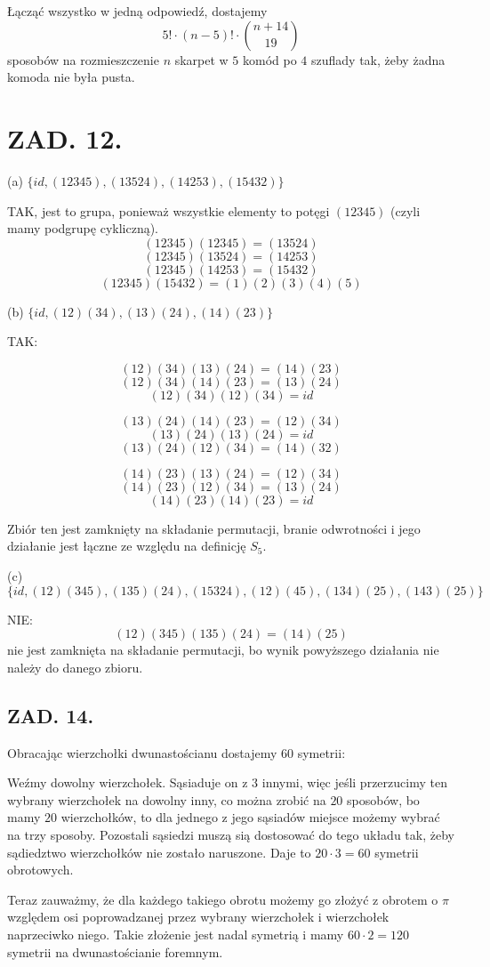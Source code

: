 \documentclass{article}[13pt]
\begin{document}
Łącząć wszystko w jedną odpowiedź, dostajemy
$$5!\cdot(n-5)!\cdot{n+14\choose 19}$$
sposobów na rozmieszczenie $n$ skarpet w $5$ komód po $4$ szuflady tak, żeby żadna komoda nie była pusta.


\section*{ZAD. 12.}

{\color{acc}(a)} $\{id, (12345), (13524), (14253), (15432)\}$
\smallskip

TAK, jest to grupa, ponieważ wszystkie elementy to potęgi $(12345)$ (czyli mamy podgrupę cykliczną).
$$(12345)(12345)=(13524)$$
$$(12345)(13524)=(14253)$$
$$(12345)(14253)=(15432)$$
$$(12345)(15432)=(1)(2)(3)(4)(5)$$

{\color{acc}(b)} $\{id, (12)(34), (13)(24), (14)(23)\}$
\smallskip

TAK:

$$(12)(34)(13)(24)=(14)(23)$$
$$(12)(34)(14)(23)=(13)(24)$$
$$(12)(34)(12)(34)=id$$

$$(13)(24)(14)(23)=(12)(34)$$
$$(13)(24)(13)(24)=id$$
$$(13)(24)(12)(34)=(14)(32)$$

$$(14)(23)(13)(24)=(12)(34)$$
$$(14)(23)(12)(34)=(13)(24)$$
$$(14)(23)(14)(23)=id$$

Zbiór ten jest zamknięty na składanie permutacji, branie odwrotności i jego działanie jest łączne ze względu na definicję $S_5$.
\medskip

{\color{acc}(c)} $\{id, (12)(345), (135)(24), (15324), (12)(45), (134)(25), (143)(25)\}$
\smallskip

NIE:
$$(12)(345)(135)(24)=(14)(25)$$
nie jest zamknięta na składanie permutacji, bo wynik powyższego działania nie należy do danego zbioru.

\subsection*{ZAD. 14.}

Obracając wierzchołki dwunastościanu dostajemy $60$ symetrii:
\smallskip

Weźmy dowolny wierzchołek. Sąsiaduje on z $3$ innymi, więc jeśli przerzucimy ten wybrany wierzchołek na dowolny inny, co można zrobić na $20$ sposobów, bo mamy $20$ wierzchołków, to dla jednego z jego sąsiadów miejsce możemy wybrać na trzy sposoby. Pozostali sąsiedzi muszą sią dostosować do tego układu tak, żeby sądiedztwo wierzchołków nie zostało naruszone. Daje to $20\cdot 3=60$ symetrii obrotowych.
\medskip

Teraz zauważmy, że dla każdego takiego obrotu możemy go złożyć z obrotem o $\pi$ względem osi poprowadzanej przez wybrany wierzchołek i wierzchołek naprzeciwko niego. Takie złożenie jest nadal symetrią i mamy $60\cdot 2=120$ symetrii na dwunastościanie foremnym.
\end{document}
